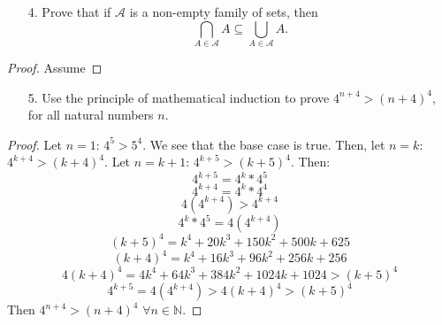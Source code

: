 \documentclass[10pt]{article}
\theoremstyle{definition}
\theoremstyle{plain}
\newcommand{\N}{\mathbb{N}}
\begin{document}
\pagebreak



\begin{enumerate}
  \item[4.] Prove that if $\mathcal{A}$ is a non-empty family of sets, then $$\bigcap_{A \in \mathcal{A}}A \subseteq \bigcup_{A \in \mathcal{A}} A.$$
\end{enumerate}

\begin{proof}
  Assume
\end{proof}



\pagebreak



\begin{enumerate}
  \item[5.] Use the principle of mathematical induction to prove $4^{n+4} > (n+4)^4,$ for all natural numbers $n$.
\end{enumerate}

\begin{proof}
  Let $n=1$: $4^5>5^4$. We see that the base case is true. Then, let $n=k$: $4^{k+4} > (k+4)^4$. Let $n=k+1$: $4^{k+5} > (k+5)^4$. Then:
    $$4^{k+5} = 4^k*4^5$$
    $$4^{k+4} = 4^k*4^4$$
    $$4(4^{k+4})>4^{k+4}$$
    $$4^k*4^5=4(4^{k+4})$$
    $$(k+5)^4 = k^4 + 20k^3 + 150k^2 + 500k + 625$$
    $$(k+4)^4 = k^4 + 16k^3 + 96k^2 + 256k + 256$$
    $$4(k+4)^4 = 4k^4 + 64k^3 + 384k^2 + 1024k + 1024 > (k+5)^4$$
    $$4^{k+5} = 4(4^{k+4})>4(k+4)^4 > (k+5)^4$$
  Then $4^{n+4} > (n+4)^4$ $\forall n\in\N$.
\end{proof}
\end{document}
